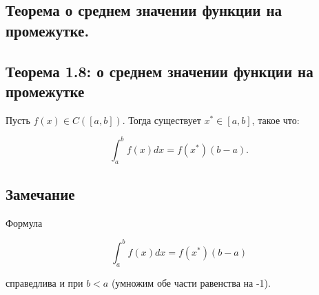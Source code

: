 {
\subsection{Теорема о среднем значении функции на промежутке.  }
\subsection*{Теорема 1.8: о среднем значении функции на промежутке}

Пусть \( f(x) \in C([a, b]) \). Тогда существует \( x^* \in [a, b] \), такое что:

\[
\int_{a}^{b} f(x) dx = f(x^*)(b - a).
\]

\subsection*{Замечание}

Формула 


\[
\int_{a}^{b} f(x)dx = f(x^*)(b - a)
\]


справедлива и при \( b < a \) (умножим обе части равенства на -1).

}